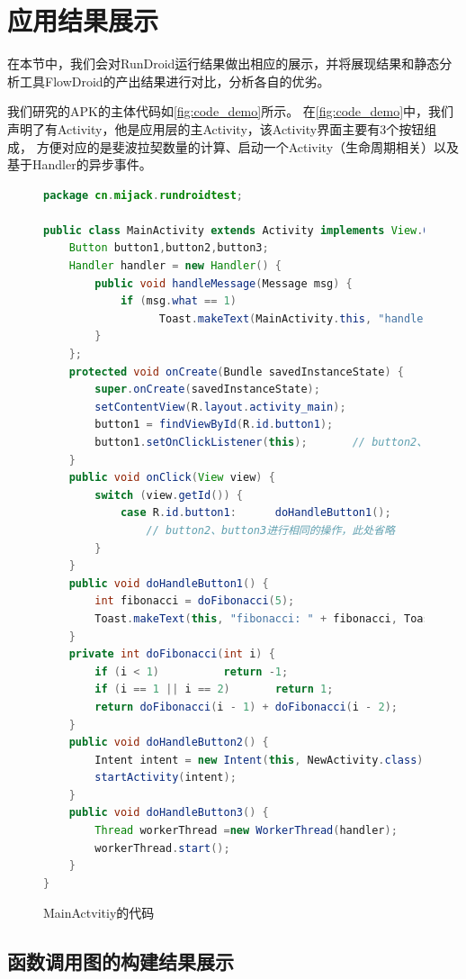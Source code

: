 \section{应用结果展示}  
在本节中，我们会对RunDroid运行结果做出相应的展示，并将展现结果和静态分析工具FlowDroid的产出结果进行对比，分析各自的优劣。

我们研究的APK的主体代码如\autoref{fig:code_demo}所示。
在\autoref{fig:code_demo}中，我们声明了有Activity，他是应用层的主Activity，该Activity界面主要有3个按钮组成，
方便对应的是斐波拉契数量的计算、启动一个Activity（生命周期相关）以及基于Handler的异步事件。



\begin{figure}[!h]
	\centering
	\begin{lstlisting}[language=Java]
package cn.mijack.rundroidtest;

public class MainActivity extends Activity implements View.OnClickListener {
	Button button1,button2,button3;
	Handler handler = new Handler() {
		public void handleMessage(Message msg) {
			if (msg.what == 1)   
			      Toast.makeText(MainActivity.this, "handle", Toast.LENGTH_SHORT).show();
		}
	};
	protected void onCreate(Bundle savedInstanceState) {
		super.onCreate(savedInstanceState);
		setContentView(R.layout.activity_main);
		button1 = findViewById(R.id.button1);
		button1.setOnClickListener(this);   	// button2、button3进行相同的操作，此处省略
	}
	public void onClick(View view) {
		switch (view.getId()) {
			case R.id.button1:		doHandleButton1();		return;				 	
				// button2、button3进行相同的操作，此处省略
		}
	}
	public void doHandleButton1() {
		int fibonacci = doFibonacci(5);
		Toast.makeText(this, "fibonacci: " + fibonacci, Toast.LENGTH_SHORT).show();
	}
	private int doFibonacci(int i) {
		if (i < 1)			return -1;
		if (i == 1 || i == 2) 		return 1;
		return doFibonacci(i - 1) + doFibonacci(i - 2);
	}
	public void doHandleButton2() {
		Intent intent = new Intent(this, NewActivity.class);
		startActivity(intent);
	}
	public void doHandleButton3() {
		Thread workerThread =new WorkerThread(handler);
		workerThread.start();
	}
}\end{lstlisting}
	\caption{MainActvitiy的代码}
	\label{fig:code_demo}
\end{figure}



\subsection{函数调用图的构建结果展示}

